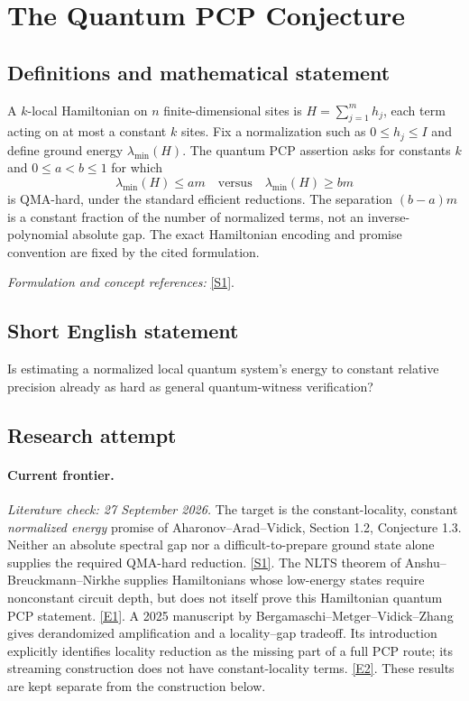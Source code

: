 \documentclass[11pt,a4paper]{article}
\newcommand{\sref}[2]{\hyperlink{source:#1:#2}{[S#2]}}
\newcommand{\eref}[2]{\hyperlink{extra:#1:#2}{[E#2]}}
\newif\ifshowcatalogue
\newcommand{\cataloguescope}[1]{\ifshowcatalogue
 \paragraph{Exact scope in the supplied catalogue.}
 \begin{quote}\small #1\end{quote}\fi}
\numberwithin{equation}{section}
\begin{document}
\setcounter{section}{40}
\clearpage
\section{\texorpdfstring{The Quantum PCP Conjecture}{The Quantum PCP Conjecture}}\label{41}
\subsection{Definitions and mathematical statement}
A $k$-local Hamiltonian on $n$ finite-dimensional sites is $H=\sum_{j=1}^m h_j$, each term acting on at most a constant $k$ sites. Fix a normalization such as $0\le h_j\le I$ and define ground energy $\lambda_{\min}(H)$. The quantum PCP assertion asks for constants $k$ and $0\le a<b\le1$ for which
\[
 \lambda_{\min}(H)\le am\quad\text{versus}\quad\lambda_{\min}(H)\ge bm
\]
is QMA-hard, under the standard efficient reductions. The separation $(b-a)m$ is a constant fraction of the number of normalized terms, not an inverse-polynomial absolute gap. The exact Hamiltonian encoding and promise convention are fixed by the cited formulation.
\par\smallskip\textit{Formulation and concept references:} \sref{41}{1}.
\cataloguescope{Prove or disprove that approximating the ground-state energy of a local Hamiltonian to within a constant additive fraction of its number of local terms is QMA-hard.}
\subsection{Short English statement}
Is estimating a normalized local quantum system's energy to constant relative precision already as hard as general quantum-witness verification?
\subsection{Research attempt}
\paragraph{Current frontier.}
\textit{Literature check: 27 September 2026.}
The target is the constant-locality, constant \emph{normalized energy}
promise of Aharonov--Arad--Vidick, Section 1.2, Conjecture 1.3.
Neither an absolute spectral gap nor a difficult-to-prepare ground state
alone supplies the required QMA-hard reduction. \sref{41}{1}.
The NLTS theorem of Anshu--Breuckmann--Nirkhe supplies Hamiltonians whose
low-energy states require nonconstant circuit depth, but does not itself
prove this Hamiltonian quantum PCP statement. \eref{41}{1}.
A 2025 manuscript by Bergamaschi--Metger--Vidick--Zhang gives derandomized
amplification and a locality--gap tradeoff. Its introduction explicitly
identifies locality reduction as the missing part of a full PCP route;
its streaming construction does not have constant-locality terms.
\eref{41}{2}. These results are kept separate from the construction below.
\end{document}
